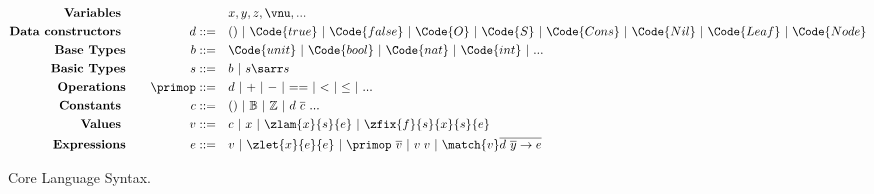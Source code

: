 \begin{figure}[h]
{\small
  \begin{alignat*}{2}
    \text{\textbf{Variables }}& \quad &\quad& x, y, z, \vnu, ...
    \\\text{\textbf{Data constructors }}& \quad &d ::= \quad & () ~|~ \Code{true} ~|~ \Code{false} ~|~ \Code{O} ~|~ \Code{S} ~|~ \Code{Cons} ~|~ \Code{Nil} ~|~ \Code{Leaf} ~|~ \Code{Node}
    \\\text{\textbf{Base Types}}& \quad & b  ::= \quad &  \Code{unit} ~|~ \Code{bool} ~|~ \Code{nat} ~|~ \Code{int} ~|~ ...
    \\\text{\textbf{Basic Types}}& \quad & s  ::= \quad &  b ~|~ s\sarr s
    \\\text{\textbf{Operations}}& \quad & \primop ::= \quad & d ~|~ {+} ~|~ {-} ~|~ {==} ~|~ {<} ~|~ {\leq} ~|~ ...
    \\ \text{\textbf{Constants }}& \quad &c ::= \quad & () ~|~ \mathbb{B} ~|~ \mathbb{Z} ~|~ d\ \overline{c}\ ...
    \\ \text{\textbf{Values }}& \quad  & v ::= \quad & c ~|~ x ~|~ \zlam{x}{s}{e} ~|~ \zfix{f}{s}{x}{s}{e}
    \\ \text{\textbf{Expressions}}& \quad & e ::=\quad & v ~|~ \zlet{x}{e}{e} ~|~ \primop\ \overline{v} ~|~  v\;v ~|~ \match{v} \overline{d\ \overline{y} \to e} 
  \end{alignat*}}
\caption{Core Language Syntax. }
\label{fig:core-lang-syntax}
\end{figure}



